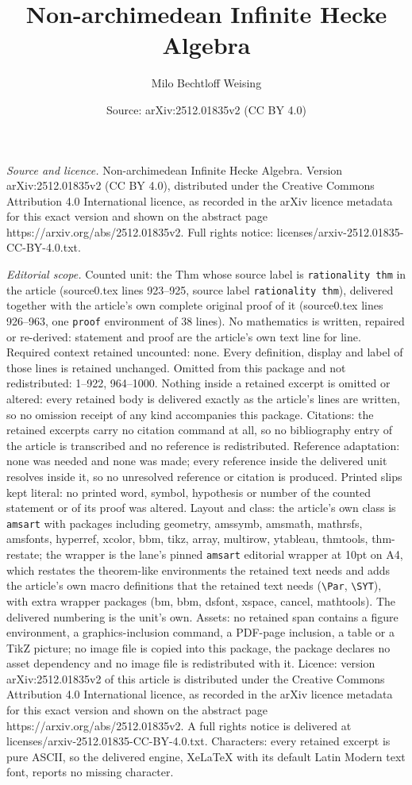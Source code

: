 \documentclass[10pt,a4paper]{amsart}
\title[Non-archimedean Infinite Hecke Algebra]{Non-archimedean Infinite Hecke Algebra}
\author{Milo Bechtloff Weising}
\date{Source: arXiv:2512.01835v2 (CC BY 4.0)}
\begin{document}
\maketitle

\noindent\emph{Source and licence.} Non-archimedean Infinite Hecke Algebra. Version arXiv:2512.01835v2 (CC BY 4.0), distributed under the Creative Commons Attribution 4.0 International licence, as recorded in the arXiv licence metadata for this exact version and shown on the abstract page https://arxiv.org/abs/2512.01835v2. Full rights notice: licenses/arxiv-2512.01835-CC-BY-4.0.txt.\par\smallskip

\noindent\textit{Editorial scope.} Counted unit: the Thm whose source label is \texttt{rationality thm} in the article (source0.tex lines 923--925, source label \texttt{rationality thm}), delivered together with the article's own complete original proof of it (source0.tex lines 926--963, one \texttt{proof} environment of 38 lines). No mathematics is written, repaired or re-derived: statement and proof are the article's own text line for line. Required context retained uncounted: none. Every definition, display and label of those lines is retained unchanged. Omitted from this package and not redistributed: 1--922, 964--1000. Nothing inside a retained excerpt is omitted or altered: every retained body is delivered exactly as the article's lines are written, so no omission receipt of any kind accompanies this package. Citations: the retained excerpts carry no citation command at all, so no bibliography entry of the article is transcribed and no reference is redistributed. Reference adaptation: none was needed and none was made; every reference inside the delivered unit resolves inside it, so no unresolved reference or citation is produced. Printed slips kept literal: no printed word, symbol, hypothesis or number of the counted statement or of its proof was altered. Layout and class: the article's own class is \texttt{amsart} with packages including geometry, amssymb, amsmath, mathrsfs, amsfonts, hyperref, xcolor, bbm, tikz, array, multirow, ytableau, thmtools, thm-restate; the wrapper is the lane's pinned \texttt{amsart} editorial wrapper at 10pt on A4, which restates the theorem-like environments the retained text needs and adds the article's own macro definitions that the retained text needs (\texttt{\textbackslash Par}, \texttt{\textbackslash SYT}), with extra wrapper packages (bm, bbm, dsfont, xspace, cancel, mathtools). The delivered numbering is the unit's own. Assets: no retained span contains a figure environment, a graphics-inclusion command, a PDF-page inclusion, a table or a TikZ picture; no image file is copied into this package, the package declares no asset dependency and no image file is redistributed with it. Licence: version arXiv:2512.01835v2 of this article is distributed under the Creative Commons Attribution 4.0 International licence, as recorded in the arXiv licence metadata for this exact version and shown on the abstract page https://arxiv.org/abs/2512.01835v2. A full rights notice is delivered at licenses/arxiv-2512.01835-CC-BY-4.0.txt. Characters: every retained excerpt is pure ASCII, so the delivered engine, XeLaTeX with its default Latin Modern text font, reports no missing character.
\end{document}
